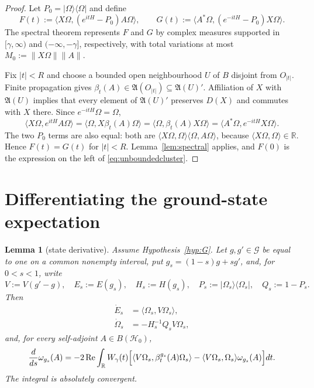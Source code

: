 \documentclass[11pt,a4paper]{article}
\newtheorem{lemma}[theorem]{Lemma}
\theoremstyle{remark}
\newcommand{\R}{\mathbb R}
\newcommand{\A}{\mathfrak A}
\newcommand{\G}{\mathcal G}
\newcommand{\Hh}{\mathcal H_0}
\newcommand{\Om}{\Omega}
\begin{document}
\begin{proof}
Let $P_0=|\Om\rangle\langle\Om|$ and define
\[
 F(t):=\langle X\Om,(e^{itH}-P_0)A\Om\rangle,
 \qquad
 G(t):=\langle A^*\Om,(e^{-itH}-P_0)X\Om\rangle.
\]
The spectral theorem represents $F$ and $G$ by complex measures supported in
$[\gamma,\infty)$ and $(-\infty,-\gamma]$, respectively, with total variations at most
$M_0:=\|X\Om\|\|A\|$.

Fix $|t|<R$ and choose a bounded open neighbourhood $U$ of $B$ disjoint from $O_{|t|}$.
Finite propagation gives $\beta_t(A)\in\A(O_{|t|})\subseteq\A(U)'$.  Affiliation of $X$ with
$\A(U)$ implies that every element of $\A(U)'$ preserves $D(X)$ and commutes with $X$ there.
Since $e^{-itH}\Om=\Om$,
\[
 \langle X\Om,e^{itH}A\Om\rangle
 =\langle\Om,X\beta_t(A)\Om\rangle
 =\langle\Om,\beta_t(A)X\Om\rangle
 =\langle A^*\Om,e^{-itH}X\Om\rangle.
\]
The two $P_0$ terms are also equal: both are
$\langle X\Om,\Om\rangle\langle\Om,A\Om\rangle$, because
$\langle X\Om,\Om\rangle\in\R$.  Hence $F(t)=G(t)$ for $|t|<R$.
Lemma~\ref{lem:spectral} applies, and $F(0)$ is the expression on the left of
\eqref{eq:unboundedcluster}.
\end{proof}

\section{Differentiating the ground-state expectation}\label{sec:derivative}

\begin{lemma}[state derivative]\label{lem:derivative}
Assume Hypothesis~\ref{hyp:G}.  Let $g,g'\in\G$ be equal to one on a common nonempty interval,
put $g_s=(1-s)g+sg'$, and, for $0<s<1$, write
\[
 V:=V(g'-g),\quad E_s:=E(g_s),\quad H_s:=H(g_s),\quad
 P_s:=|\Om_s\rangle\langle\Om_s|,\quad Q_s:=1-P_s.
\]
Then
\begin{align}
 \dot E_s&=\langle\Om_s,V\Om_s\rangle,\label{eq:HF}\\
 \dot\Om_s&=-H_s^{-1}Q_sV\Om_s,\label{eq:eigenderivative}
\end{align}
and, for every self-adjoint $A\in B(\Hh)$,
\begin{equation}\label{eq:statederivative}
 \frac d{ds}\omega_{g_s}(A)
 =-2\operatorname{Re}\int_\R W_\gamma(t)
 \Bigl[
 \langle V\Om_s,\beta_t^{g_s}(A)\Om_s\rangle
 -\langle V\Om_s,\Om_s\rangle\omega_{g_s}(A)
 \Bigr]dt.
\end{equation}
The integral is absolutely convergent.
\end{lemma}
\end{document}
